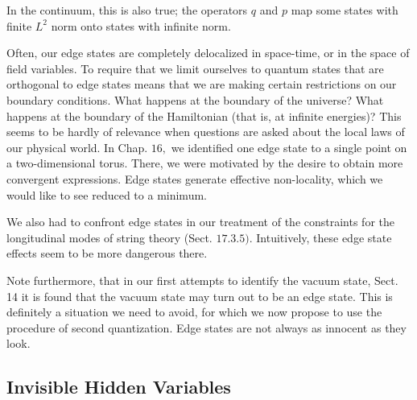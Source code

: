 \documentclass[main.tex]{subfiles}
\begin{document}
In the continuum, this is also true; the operators $q$ and $p$ map some states with finite $L^{2}$ norm onto states with infinite norm.

Often, our edge states are completely delocalized in space-time, or in the space of field variables. To require that we limit ourselves to quantum states that are orthogonal to edge states means that we are making certain restrictions on our boundary conditions. What happens at the boundary of the universe? What happens at the boundary of the Hamiltonian (that is, at infinite energies)? This seems to be hardly of relevance when questions are asked about the local laws of our physical world. In Chap. $16,$ we identified one edge state to a single point on a two-dimensional torus. There, we were motivated by the desire to obtain more convergent expressions. Edge states generate effective non-locality, which we would like to see reduced to a minimum.

We also had to confront edge states in our treatment of the constraints for the longitudinal modes of string theory (Sect. $17.3 .5) .$ Intuitively, these edge state effects seem to be more dangerous there.

Note furthermore, that in our first attempts to identify the vacuum state, Sect. 14 it is found that the vacuum state may turn out to be an edge state. This is definitely a situation we need to avoid, for which we now propose to use the procedure of second quantization. Edge states are not always as innocent as they look.


\subsection{Invisible Hidden Variables}\label{ch22.3}
\end{document}

